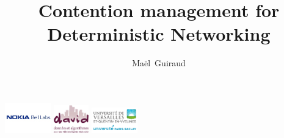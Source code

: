 \documentclass[10 pt]{beamer}
\title{Contention management for Deterministic Networking}
\author{Maël~Guiraud }
\institute[Nokia Bell Labs, DAVID-UVSQ] 
{
  Nokia Bell Labs France - 
  DAVID, Universit\'e de Versailles Saint Quentin\\
}
\begin{document}
\begin{frame}

  \titlepage
  \centering
  \includegraphics [width=20mm]{logon.png} \hspace{1cm} \includegraphics [width=15mm]{logod.png} \hspace{1cm} \includegraphics [width=20mm]{logo.png} \\
\end{frame}

\begin{frame}

  \tableofcontents[]
\end{frame}

\AtBeginSection[]{\begin{frame}

  \small \tableofcontents[currentsection]
\end{frame}
}
\end{document}
